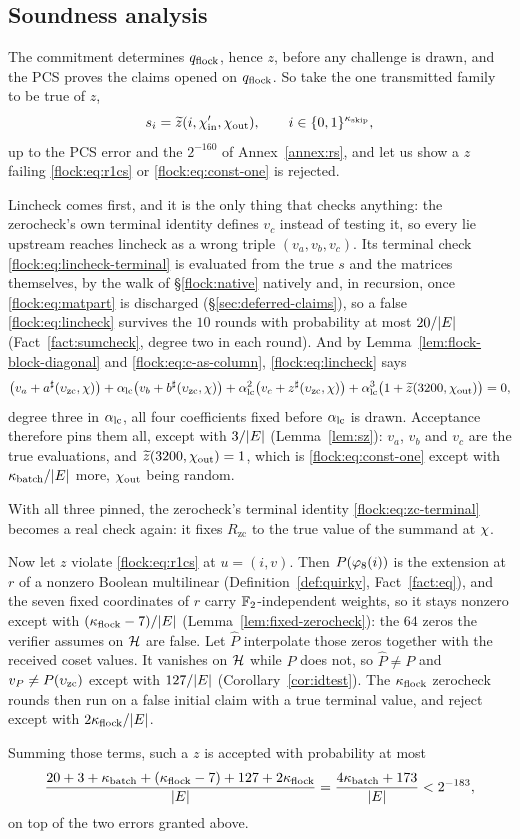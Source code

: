 \subsection{Soundness analysis}\label{flock:soundness}


The commitment determines $q_{\mathrm{flock}}$, hence $z$, before any challenge is drawn, and the PCS proves the claims opened on $q_{\mathrm{flock}}$. So take the one transmitted family to be true of $z$,
\[
s_i=\widetilde{z}(i,\chi'_{\mathrm{in}},\chi_{\mathrm{out}}),\qquad i\in\{0,1\}^{\kappa_{\mathrm{skip}}},
\]
up to the PCS error and the $2^{-160}$ of Annex~\ref{annex:rs}, and let us show a $z$ failing \eqref{flock:eq:r1cs} or \eqref{flock:eq:const-one} is rejected.

Lincheck comes first, and it is the only thing that checks anything: the zerocheck's own terminal identity defines $v_c$ instead of testing it, so every lie upstream reaches lincheck as a wrong triple $(v_a,v_b,v_c)$. Its terminal check \eqref{flock:eq:lincheck-terminal} is evaluated from the true $s$ and the matrices themselves, by the walk of \S\ref{flock:native} natively and, in recursion, once \eqref{flock:eq:matpart} is discharged (\S\ref{sec:deferred-claims}), so a false \eqref{flock:eq:lincheck} survives the $10$ rounds with probability at most $20/|E|$ (Fact~\ref{fact:sumcheck}, degree two in each round). And by Lemma~\ref{lem:flock-block-diagonal} and \eqref{flock:eq:c-as-column}, \eqref{flock:eq:lincheck} says
\[
\bigl(v_a+a^{\sharp}(\upsilon_{\mathrm{zc}},\chi)\bigr)+\alpha_{\mathrm{lc}}\bigl(v_b+b^{\sharp}(\upsilon_{\mathrm{zc}},\chi)\bigr)+\alpha_{\mathrm{lc}}^2\bigl(v_c+z^{\sharp}(\upsilon_{\mathrm{zc}},\chi)\bigr)+\alpha_{\mathrm{lc}}^3\bigl(1+\widetilde{z}(3200,\chi_{\mathrm{out}})\bigr)=0,
\]
degree three in $\alpha_{\mathrm{lc}}$, all four coefficients fixed before $\alpha_{\mathrm{lc}}$ is drawn. Acceptance therefore pins them all, except with $3/|E|$ (Lemma~\ref{lem:sz}): $v_a$, $v_b$ and $v_c$ are the true evaluations, and $\widetilde{z}(3200,\chi_{\mathrm{out}})=1$, which is \eqref{flock:eq:const-one} except with $\kappa_{\mathrm{batch}}/|E|$ more, $\chi_{\mathrm{out}}$ being random.

With all three pinned, the zerocheck's terminal identity \eqref{flock:eq:zc-terminal} becomes a real check again: it fixes $R_{\mathrm{zc}}$ to the true value of the summand at $\chi$.

Now let $z$ violate \eqref{flock:eq:r1cs} at $u=(i,v)$. Then $P(\varphi_{8}(i))$ is the extension at $r$ of a nonzero Boolean multilinear (Definition~\ref{def:quirky}, Fact~\ref{fact:eq}), and the seven fixed coordinates of $r$ carry $\mathbb{F}_2$-independent weights, so it stays nonzero except with $(\kappa_{\mathrm{flock}}-7)/|E|$ (Lemma~\ref{lem:fixed-zerocheck}): the $64$ zeros the verifier assumes on $\mathcal{H}$ are false. Let $\hat P$ interpolate those zeros together with the received coset values. It vanishes on $\mathcal{H}$ while $P$ does not, so $\hat P\neq P$ and $v_P\neq P(\upsilon_{\mathrm{zc}})$ except with $127/|E|$ (Corollary~\ref{cor:idtest}). The $\kappa_{\mathrm{flock}}$ zerocheck rounds then run on a false initial claim with a true terminal value, and reject except with $2\kappa_{\mathrm{flock}}/|E|$.

Summing those terms, such a $z$ is accepted with probability at most
\[
\frac{20+3+\kappa_{\mathrm{batch}}+(\kappa_{\mathrm{flock}}-7)+127+2\kappa_{\mathrm{flock}}}{|E|}=\frac{4\kappa_{\mathrm{batch}}+173}{|E|}<2^{-183},
\]
on top of the two errors granted above.
